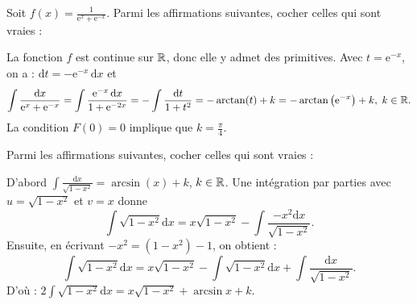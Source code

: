 \begin{question}
Soit $\displaystyle f(x)=\frac{1}{\mathrm{e}^x+\mathrm{e}^{-x}}$. Parmi les affirmations suivantes, cocher celles qui sont vraies :
\begin{answers} 
\end{answers}
\begin{explanations}
La fonction $f$ est continue sur $\mathbb{R}$, donc elle y admet des primitives. Avec $t=\mathrm{e}^{-x}$, on a : $\mathrm{d}t=-\mathrm{e}^{-x}\, \mathrm{d}x$ et
$$\int \frac{\mathrm{d}x}{\mathrm{e}^x+\mathrm{e}^{-x}}=\int \frac{\mathrm{e}^{-x}\, \mathrm{d}x}{1+\mathrm{e}^{-2x}}=-\int \frac{\mathrm{d}t}{1+t^2}=-\arctan (t)+k=-\arctan \left(\mathrm{e}^{-x}\right)+k,\; k\in \mathbb{R}.$$
La condition $F(0)=0$ implique que $\displaystyle k=\frac{\pi}{4}$.
\end{explanations}
\end{question}

\begin{question}
Parmi les affirmations suivantes, cocher celles qui sont vraies :
\begin{answers} 
\good{Une primitive de $\displaystyle \sqrt{1-x^2}$ sur $]-1,1[$ est $\displaystyle \frac{1}{2}x\sqrt{1-x^2}+\frac{1}{2}\arcsin (x)$.}
\end{answers}
\vskip2mm
\begin{explanations}
D'abord $\displaystyle \int \frac{\mathrm{d}x}{\sqrt{1-x^2}}=\arcsin (x)+k$, $k\in \mathbb{R}$. Une intégration par parties avec $u=\sqrt{1-x^2}$ et $v=x$ donne
$$\int \sqrt{1-x^2}\mathrm{d}x=x\sqrt{1-x^2}-\int \frac{-x^2\mathrm{d}x}{\sqrt{1-x^2}}.$$
Ensuite, en écrivant $\displaystyle -x^2=(1-x^2)-1$, on obtient : 
$$\int \sqrt{1-x^2}\mathrm{d}x=x\sqrt{1-x^2}-\int \sqrt{1-x^2}\mathrm{d}x+\int \frac{\mathrm{d}x}{\sqrt{1-x^2}}.$$
D'où : $\displaystyle 2\int \sqrt{1-x^2}\mathrm{d}x=x\sqrt{1-x^2}+\arcsin x+k$.
\end{explanations}
\end{question}  

